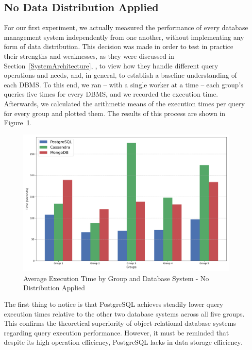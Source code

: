 \documentclass[conference]{IEEEtran}
\begin{document}
\subsection{No Data Distribution Applied}\label{no_dist}

For our first experiment, we actually measured the performance of every database management system independently from one another, without implementing any form of data distribution. This decision was made in order to test in practice their strengths and weaknesses, as they were discussed in Section~\ref{SystemArchitecture}, , to view how they handle different query operations and needs, and, in general, to establish a baseline understanding of each DBMS. To this end, we ran – with a single worker at a time – each group’s queries five times for every DBMS, and we recorded the execution time. Afterwards, we calculated the arithmetic means of the execution times per query for every group and plotted them. The results of this process are shown in Figure~\ref{fig:no_dist_applied}.

\begin{figure}[htbp]
    \centering
    \includegraphics[width=\linewidth]{figures/no_dist_applied.png}
    \caption{Average Execution Time by Group and Database System - No Distribution Applied}
    \label{fig:no_dist_applied}
\end{figure}

The first thing to notice is that PostgreSQL achieves steadily lower query execution times relative to the other two database systems across all five groups. This confirms the theoretical superiority of object-relational database systems regarding query execution performance. However, it must be reminded that despite its high operation efficiency, PostgreSQL lacks in data storage efficiency.
\end{document}
